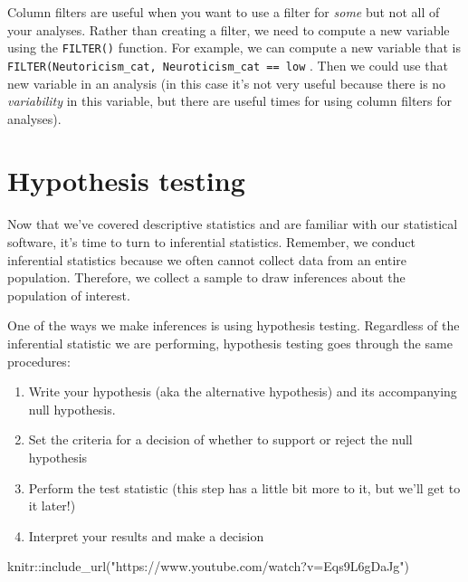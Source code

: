 \documentclass[
]{book}
\newenvironment{Shaded}{\begin{snugshade}}{\end{snugshade}}
\newcommand{\FunctionTok}[1]{\textcolor[rgb]{0.00,0.00,0.00}{#1}}
\newcommand{\NormalTok}[1]{#1}
\newcommand{\SpecialCharTok}[1]{\textcolor[rgb]{0.00,0.00,0.00}{#1}}
\newcommand{\StringTok}[1]{\textcolor[rgb]{0.31,0.60,0.02}{#1}}
\providecommand{\tightlist}{%
  \setlength{\itemsep}{0pt}\setlength{\parskip}{0pt}}
\begin{document}
Column filters are useful when you want to use a filter for \emph{some} but not all of your analyses. Rather than creating a filter, we need to compute a new variable using the \texttt{FILTER()} function. For example, we can compute a new variable that is \texttt{FILTER(Neutoricism\_cat,\ Neuroticism\_cat\ ==\ \textquotesingle{}low\textquotesingle{}} . Then we could use that new variable in an analysis (in this case it's not very useful because there is no \emph{variability} in this variable, but there are useful times for using column filters for analyses).

\hypertarget{hypothesis-testing}{%
\chapter{Hypothesis testing}\label{hypothesis-testing}}

Now that we've covered descriptive statistics and are familiar with our statistical software, it's time to turn to inferential statistics. Remember, we conduct inferential statistics because we often cannot collect data from an entire population. Therefore, we collect a sample to draw inferences about the population of interest.

One of the ways we make inferences is using hypothesis testing. Regardless of the inferential statistic we are performing, hypothesis testing goes through the same procedures:

\begin{enumerate}
\def\labelenumi{\arabic{enumi}.}
\tightlist
\item
  Write your hypothesis (aka the alternative hypothesis) and its accompanying null hypothesis.
\item
  Set the criteria for a decision of whether to support or reject the null hypothesis
\item
  Perform the test statistic (this step has a little bit more to it, but we'll get to it later!)
\item
  Interpret your results and make a decision
\end{enumerate}

\begin{Shaded}
\begin{Highlighting}[]
\NormalTok{knitr}\SpecialCharTok{::}\FunctionTok{include\_url}\NormalTok{(}\StringTok{"https://www.youtube.com/watch?v=Eqs9L6gDaJg"}\NormalTok{)}
\end{Highlighting}
\end{Shaded}
\end{document}
